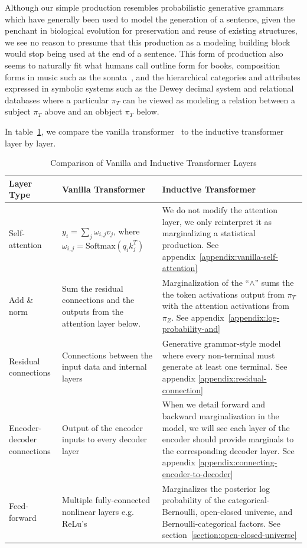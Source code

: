 \documentclass{article}
\begin{document}
Although our simple production resembles probabilistic generative grammars which have generally been used to model the generation of a sentence, given the penchant in biological evolution for preservation and reuse of existing structures, we see no reason to presume that this production as a modeling building block would stop being used at the end of a sentence.  This form of production also seems to naturally fit what humans call outline form for books, composition forms in music such as the sonata~\citep{Lerdahl1983}, and the hierarchical categories and attributes expressed in symbolic systems such as the Dewey decimal system and relational databases where a particular $\pi_T$ can be viewed as modeling a relation between a subject $\pi_T$ above and an obbject $\pi_T$ below.

In table~\ref{tab:rosetta}, we compare the vanilla transformer~\citep{vaswani2017attention} to the inductive transformer layer by layer.

\setlength{\extrarowheight}{5pt}
\begin{table}[H]
    \centering
    \begin{tabular}{p{}>{\raggedright\arraybackslash}p{}p{}}
      \textbf{Layer Type} & \textbf{Vanilla Transformer}   &   \textbf{Inductive Transformer}   \\
      \hline
      Self-attention & $y_i = \sum_j \omega_{i,j} v_j$, where \qquad $\omega_{i,j} = \textrm{Softmax}(q_i k_j^T)$ & We do not modify the attention layer, we only reinterpret it as marginalizing a statistical production. See appendix~\ref{appendix:vanilla-self-attention} \\
      \hline
      Add \& norm & Sum the residual connections and the outputs from the attention layer below.  &  Marginalization of the ``$\land$'' sums the the token activations output from $\pi_T$ with the attention activations from $\pi_Z$. See appendix~\ref{appendix:log-probability-and}\\
      \hline
      Residual connections & Connections between the input data and internal layers & Generative grammar-style model where every non-terminal must generate at least one terminal. See appendix \ref{appendix:residual-connection} \\
      \hline
      Encoder-decoder connections & Output of the encoder inputs to every decoder layer & When we detail forward and backward marginalization in the model, we will see each layer of the encoder should provide marginals to the corresponding decoder layer. See appendix \ref{appendix:connecting-encoder-to-decoder}\\
      \hline
      Feed-forward & Multiple fully-connected nonlinear layers e.g. ReLu's & Marginalizes the posterior log probability of the categorical-Bernoulli, open-closed universe, and Bernoulli-categorical factors. See section~\ref{section:open-closed-universe} \\
      \hline
    \end{tabular}
    \caption{Comparison of Vanilla and Inductive Transformer Layers}
    \label{tab:rosetta}
\end{table}
\end{document}
